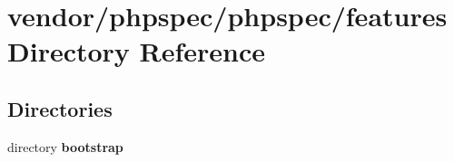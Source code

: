 \section{vendor/phpspec/phpspec/features Directory Reference}
\label{dir_58bf45cae53b34f31aaa863487c2e5f5}
\subsection*{Directories}
\begin{DoxyCompactItemize}
\item 
directory {\bf bootstrap}
\end{DoxyCompactItemize}
